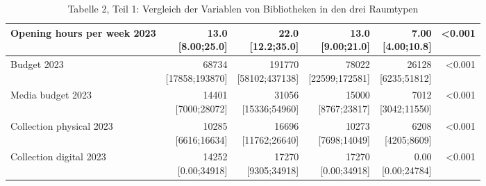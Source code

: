 \documentclass[a4paper,
fontsize=11pt,
oneside,
numbers=noperiodatend,
parskip=half-,
bibliography=totoc,
final
]{scrartcl}
\begin{document}
\begin{landscape}
\begin{table}[]
\begin{tabular}{lrrrrr}
Opening hours per week 2023      & \makecell{ 13.0 \\ {[}8.00;25.0{]}}     & \makecell{ 22.0 \\ {[}12.2;35.0{]}}      & \makecell{ 13.0 \\ {[}9.00;21.0{]}}     & \makecell{ 7.00 \\ {[}4.00;10.8{]}}   & \textless{}0.001   \\ \hline
Budget 2023                      & \makecell{ 68734 \\ {[}17858;193870{]}} & \makecell{ 191770 \\ {[}58102;437138{]}} & \makecell{ 78022 \\ {[}22599;172581{]}} & \makecell{ 26128 \\ {[}6235;51812{]}} & \textless{}0.001   \\ \hline
Media budget 2023                & \makecell{ 14401 \\ {[}7000;28072{]}}   & \makecell{ 31056 \\ {[}15336;54960{]}}   & \makecell{ 15000 \\ {[}8767;23817{]}}   & \makecell{ 7012 \\ {[}3042;11550{]}}  & \textless{}0.001   \\ \hline
Collection physical 2023         & \makecell{ 10285 \\ {[}6616;16634{]}}   & \makecell{ 16696 \\ {[}11762;26640{]}}   & \makecell{ 10273 \\ {[}7698;14049{]}}   & \makecell{ 6208 \\ {[}4205;8609{]}}   & \textless{}0.001   \\ \hline
Collection digital 2023          & \makecell{ 14252 \\ {[}0.00;34918{]}}   & \makecell{ 17270 \\ {[}9305;34918{]}}    & \makecell{ 17270 \\ {[}0.00;34918{]}}   & \makecell{ 0.00 \\ {[}0.00;24784{]}}  & \textless{}0.001   \\ \hline
\end{tabular}
\caption{Tabelle 2, Teil 1: Vergleich der Variablen von Bibliotheken in den drei Raumtypen}
\end{table}
\end{landscape}
\end{document}
